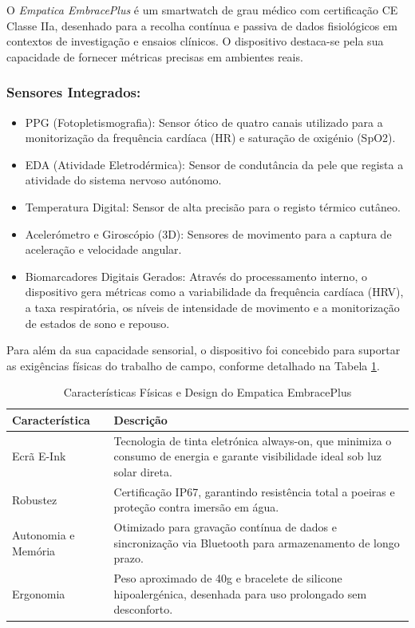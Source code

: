 O \textit{Empatica EmbracePlus} \cite{empatica_embraceplus} é um smartwatch de grau médico com certificação CE Classe IIa, desenhado para a recolha contínua e passiva de dados fisiológicos em contextos de investigação e ensaios clínicos. \cite{empatica_ce_2021} O dispositivo destaca-se pela sua capacidade de fornecer métricas precisas em ambientes reais.

\subsubsection*{Sensores Integrados:}

\begin{itemize}
\item PPG (Fotopletismografia): Sensor ótico de quatro canais utilizado para a monitorização da frequência cardíaca (HR) e saturação de oxigénio (SpO2).
\item EDA (Atividade Eletrodérmica): Sensor de condutância da pele que regista a atividade do sistema nervoso autónomo.
\item Temperatura Digital: Sensor de alta precisão para o registo térmico cutâneo.
\item Acelerómetro e Giroscópio (3D): Sensores de movimento para a captura de aceleração e velocidade angular.
\item Biomarcadores Digitais Gerados: Através do processamento interno, o dispositivo gera métricas como a variabilidade da frequência cardíaca (HRV), a taxa respiratória, os níveis de intensidade de movimento e a monitorização de estados de sono e repouso.
\end{itemize}

Para além da sua capacidade sensorial, o dispositivo foi concebido para suportar as exigências físicas do trabalho de campo, conforme detalhado na Tabela \ref{tab:empatica_features}.

\begin{table}[H]
\centering
\caption{Características Físicas e Design do Empatica EmbracePlus}
\label{tab:empatica_features}
\begin{tabular}{l p{10cm}}
\hline
Característica & Descrição \\
\hline
Ecrã E-Ink & Tecnologia de tinta eletrónica always-on, que minimiza o consumo de energia e garante visibilidade ideal sob luz solar direta. \\
\hline
Robustez & Certificação IP67, garantindo resistência total a poeiras e proteção contra imersão em água. \\
\hline
Autonomia e Memória & Otimizado para gravação contínua de dados e sincronização via Bluetooth para armazenamento de longo prazo. \\
\hline
Ergonomia & Peso aproximado de 40g e bracelete de silicone hipoalergénica, desenhada para uso prolongado sem desconforto. \\
\hline
\end{tabular}
\end{table}


